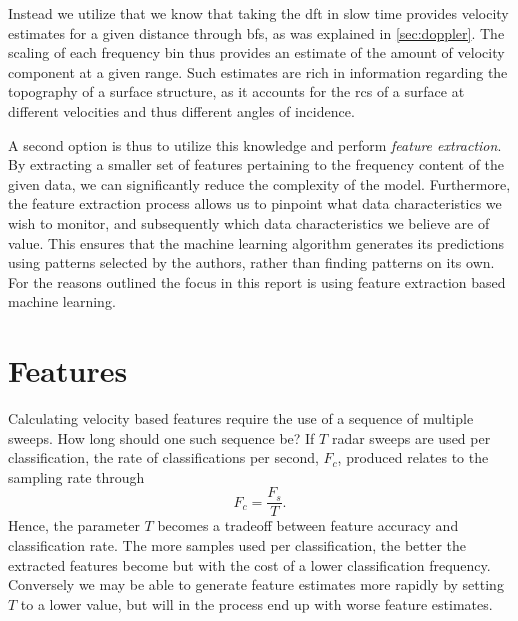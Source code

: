 Instead we utilize that we know that taking the \gls{dft} in slow time provides velocity estimates for a given distance through \gls{bf}s, as was explained in \ref{sec:doppler}. The scaling of each frequency bin thus provides an estimate of the amount of velocity component at a given range. Such estimates are rich in information regarding the topography of a surface structure, as it accounts for the \gls{rcs} of a surface at different velocities and thus different angles of incidence. 

A second option is thus to utilize this knowledge and perform \emph{feature extraction}. By extracting a smaller set of features pertaining to the frequency content of the given data, we can significantly reduce the complexity of the model. Furthermore, the feature extraction process allows us to pinpoint what data characteristics we wish to monitor, and subsequently which data characteristics we believe are of value. This ensures that the machine learning algorithm generates its predictions using patterns selected by the authors, rather than finding patterns on its own. For the reasons outlined the focus in this report is using feature extraction based machine learning. 

\section{Features}

Calculating velocity based features require the use of a sequence of multiple sweeps. How long should one such sequence be? If $T$ radar sweeps are used per classification, the rate of classifications per second, $F_c$, produced relates to the sampling rate through
\begin{equation}
	\label{eq:classification_rate}
	F_c = \frac{F_s}{T}.
\end{equation} 
Hence, the parameter $T$ becomes a tradeoff between feature accuracy and classification rate. The more samples used per classification, the better the extracted features become but with the cost of a lower classification frequency. Conversely we may be able to generate feature estimates more rapidly by setting $T$ to a lower value, but will in the process end up with worse feature estimates. 



